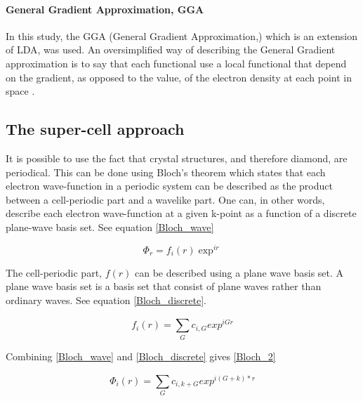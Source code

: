 \documentclass[12pt,a4paper]{article}
\begin{document}
\paragraph{General Gradient Approximation, GGA}
In this study, the GGA (General Gradient Approximation,) which is an extension of LDA, was used. An oversimplified way of describing the General Gradient approximation is to say that each functional use a local functional that depend on the gradient, as opposed to the value, of the electron density at each point in space \cite{burke}.


\subsection{The super-cell approach}
It is  possible to use the fact that crystal structures, and therefore diamond, are periodical. This can be done using Bloch's theorem which states that each electron wave-function in a periodic system can be described as the product between a cell-periodic part and a wavelike part. One can, in other words, describe each electron wave-function at a given k-point as a function of a discrete plane-wave basis set. See equation \ref{Bloch_wave}

\begin{equation}\label{Bloch_wave} \tag{Bloch's theorem 1} 
\Phi_r=f_i(r)\exp^{ir}
\end{equation}

The cell-periodic part, $f(r)$ can be described using a plane wave basis set. A plane wave basis set is a basis set that consist of plane waves rather than ordinary waves. See equation \ref{Bloch_discrete}.

\begin{equation}\label{Bloch_discrete} \tag{Bloch's theorem (discrete part 1)} 
f_i(r)=\sum\limits_{G}^{} c_{i, G} exp^{iGr}
\end{equation}

Combining \ref{Bloch_wave} and \ref{Bloch_discrete} gives \ref{Bloch_2}

\begin{equation}\label{Bloch_2} \tag{Bloch's theorem 2} 
\Phi_i(r)=\sum\limits_{G}^{} c_{i,k + G} exp^{i(G+k)*r}
\end{equation}
\end{document}
